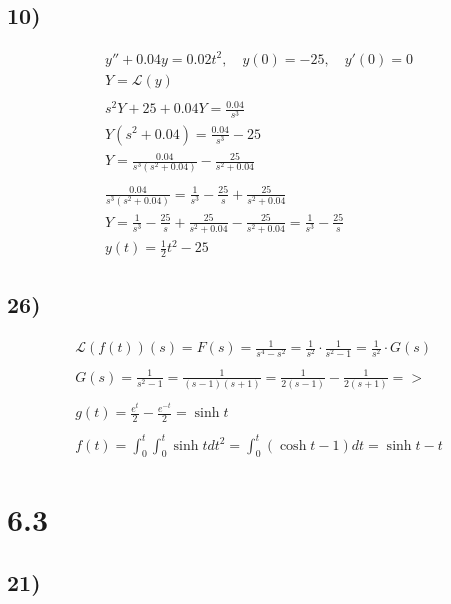 \documentclass{article}
\newcommand{\paranth}[1]{\left( #1 \right)}
\newcommand{\laplace}[1]{\mathcal{L}\paranth{#1}}
\begin{document}
\subsection*{10)}

\begin{gather*}
	y'' + 0.04 y = 0.02 t^2, \quad
	y(0) = - 25, \quad
	y'(0) = 0 \\
	Y = \laplace{y} \\ \\
	s^2 Y + 25 + 0.04 Y = \frac{0.04}{s^3} \\
	Y \paranth{s^2 + 0.04} = \frac{0.04}{s^3} - 25 \\
	Y = \frac{0.04}{s^3 \paranth{s^2 + 0.04}} - \frac{25}{s^2 + 0.04} \\ \\
	\frac{0.04}{s^3 \paranth{s^2 + 0.04}} = \frac{1}{s^3} - \frac{25}{s} + \frac{25}{s^2 + 0.04} \\
	Y = \frac{1}{s^3} - \frac{25}{s} + \frac{25}{s^2 + 0.04} - \frac{25}{s^2 + 0.04} = \frac{1}{s^3} - \frac{25}{s} \\
	y(t) = \frac{1}{2} t^2 - 25
\end{gather*}

\newpage


\subsection*{26)}

\begin{gather*}
	\laplace{f(t)}(s) = F(s)	=
	\frac{1}{s^4 - s^2}	=
	\frac{1}{s^2}	\cdot	\frac{1}{s^2 - 1} =
	\frac{1}{s^2}	\cdot	G(s) \\ \\
	G(s) = \frac{1}{s^2 - 1} =
	\frac{1}{\paranth{s - 1} \paranth{s + 1}} =
	\frac{1}{2 \paranth{s - 1}} - \frac{1}{2 \paranth{s + 1}} => \\ \\
	g(t) = \frac{e^{t}}{2} - \frac{e^{-t}}{2} = \sinh{t} \\ \\
	f(t) = \int_0^t{\int_0^t{\sinh{t} dt^2}} =
	\int_0^t{\paranth{\cosh{t} - 1} dt} =
	\sinh{t} - t
\end{gather*}


\section*{\textbf{6.3}}

\subsection*{21)}
\end{document}
